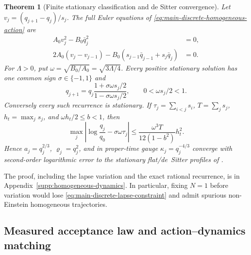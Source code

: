\documentclass[11pt]{article}
\newtheorem{theorem}{Theorem}[section]
\theoremstyle{definition}
\theoremstyle{remark}
\begin{document}
\begin{theorem}[Finite stationary classification and de Sitter convergence]
\label{thm:main-finite-homogeneous-stationarity}
Let $v_j=(q_{j+1}-q_j)/s_j$.  The full Euler equations of
\eqref{eq:main-discrete-homogeneous-action} are
\begin{align}
 A_0v_j^2-B_0\bar q_j^2&=0,\label{eq:main-discrete-lapse-constraint}\\
 2A_0(v_j-v_{j-1})
 -B_0(s_{j-1}\bar q_{j-1}+s_j\bar q_j)&=0.
 \label{eq:main-discrete-scale-euler}
\end{align}
For $\Lambda>0$, put $\omega=\sqrt{B_0/A_0}=\sqrt{3\Lambda/4}$.
Every positive stationary solution has one common sign
$\sigma\in\{-1,1\}$ and
\begin{equation}
 \boxed{
 q_{j+1}=q_j
 \frac{1+\sigma\omega s_j/2}{1-\sigma\omega s_j/2},
 \qquad 0<\omega s_j/2<1.}
 \label{eq:main-finite-stationary-recurrence}
\end{equation}
Conversely every such recurrence is stationary.  If
$\tau_j=\sum_{i<j}s_i$, $T=\sum_js_j$, $h_t=\max_js_j$, and
$\omega h_t/2\le b<1$, then
\begin{equation}
 \boxed{
 \max_j\left|\log\frac{q_j}{q_0}-\sigma\omega\tau_j\right|
 \le \frac{\omega^3T}{12(1-b^2)}h_t^2.}
 \label{eq:main-finite-profile-convergence}
\end{equation}
Hence $a_j=q_j^{2/3}$, $\varrho_j=q_j^2$, and in proper-time gauge
$\kappa_j=q_j^{-4/3}$ converge with second-order logarithmic error to the
stationary flat/de~Sitter profiles of
.
\end{theorem}

The proof, including the lapse variation and the exact rational recurrence, is
in Appendix~\ref{supp:homogeneous-dynamics}.  In particular, fixing $N=1$
before variation would lose \eqref{eq:main-discrete-lapse-constraint} and admit
spurious non-Einstein homogeneous trajectories.

\subsection{Measured acceptance law and action--dynamics matching}
\label{subsec:operational-homogeneous-main}
\end{document}
